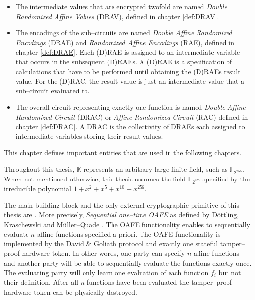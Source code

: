 \begin{itemize}

  \item The intermediate values that are encrypted twofold are named
    \emph{Double Randomized Affine Values} (DRAV), defined in chapter
    \ref{def:DRAV}.

  \item The encodings of the sub--circuits are named \emph{Double Affine
    Randomized Encodings} (DRAE) and \emph{Randomized Affine Encodings} (RAE),
    defined in chapter \ref{def:DRAE}. Each (D)RAE is assigned to an
    intermediate variable that occurs in the subsequent (D)RAEs. A (D)RAE is a
    specification of calculations that have to be performed until obtaining the
    (D)RAEs result value. For the (D)RAC, the result value is just an
    intermediate value that a sub--circuit evaluated to.

  \item The overall circuit representing exactly one function is named
    \emph{Double Affine Randomized Circuit} (DRAC) or \emph{Affine Randomized
    Circuit} (RAC) defined in chapter \ref{def:DRAC}. A DRAC is the collectivity
    of DRAEs each assigned to intermediate variables storing their result
    values.

\end{itemize}


%
%
\label{sec:rae-definitions}

This chapter defines important entities that are used in the following chapters.

\label{sec:field}

\label{def:field} Throughout this thesis, $\mathbb{K}$ represents an arbitrary
large finite field, such as $\mathbb{F}_{2^{256}}$.  When not mentioned
otherwise, this thesis assumes the field $\mathbb{F}_{2^{256}}$ specified by the
irreducible polynomial $1 + x^2 + x^5 + x^{10} + x^{256}$.



The main building block and the only external cryptographic primitive of this
thesis are . More
precisely, \emph{Sequential one--time OAFE} as defined by Döttling, Kraschewski
and Müller--Quade \cite{davidgoliath}. The OAFE functionality enables to
sequentially evaluate $n$ affine functions specified a priori. The OAFE
functionality is implemented by the David \& Goliath protocol
\cite{davidgoliath} and exactly one stateful tamper--proof hardware token. In
other words, one party can specify $n$ affine functions and another party will
be able to sequentially evaluate the functions exactly once. The evaluating
party will only learn one evaluation of each function $f_i$ but not their
definition. After all $n$ functions have been evaluated the tamper--proof
hardware token can be physically destroyed.


